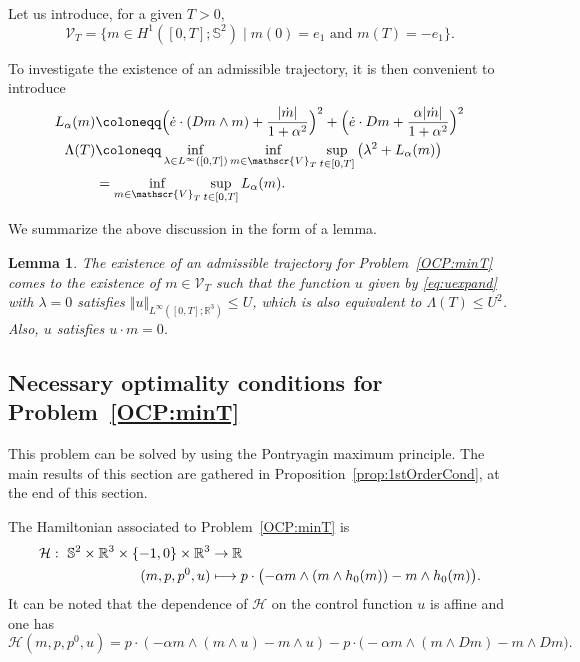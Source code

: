 \documentclass[10pt]{amsart}
\newcommand\mto{\mathchoice{\longmapsto}{\mapsto}{\mapsto}{\mapsto}}
\newtheorem{lemma}[theorem]{Lemma}
\theoremstyle{definition}
\newcommand{\R} {\mathbb{R}}
\begin{document}
Let us introduce, for a given $T>0$,
\[
\mathscr{V}_T=\{m\in H^1([0,T];\mathbb{S}^2)\mid m(0)=e_1\text{ and }m(T)=-e_1\}.
\]

To investigate the existence of an admissible trajectory, it is then convenient to introduce
\begin{align}\label{ob:aux}
L_\alpha(m) &\coloneqq \Bigl(\dot e\cdot (Dm\wedge m)+\frac{|\dot m|}{1+\alpha^2}\Bigr)^2+\Bigl(\dot e\cdot Dm+\frac{\alpha|\dot m|}{1+\alpha^2}\Bigr)^2\\
\Lambda(T)&\coloneqq \inf_{\lambda\in L^\infty([0,T])}\inf_{m\in \mathscr{V}_T}\sup_{t\in [0,T]}\left(\lambda^2+L_\alpha(m) \right)\nonumber \\
&= \inf_{m\in \mathscr{V}_T}\sup_{t\in [0,T]}L_\alpha(m).
\end{align}

We summarize the above discussion in the form of a lemma.

\begin{lemma}\label{lem:2057}
The existence of an admissible trajectory for Problem~\eqref{OCP:minT} comes to the existence of $m\in \mathscr{V}_T$ such that the function $u$ given by \eqref{eq:uexpand} with $\lambda =0$ satisfies $\Vert u\Vert_{L^\infty([0,T];\mathbb{R}^3)}\leq U $, which is also equivalent to $\Lambda(T)\leq U ^2$. Also, $u$ satisfies $u \cdot m=0$.
\end{lemma}

\subsection{Necessary optimality conditions for Problem~\texorpdfstring{\eqref{OCP:minT}}{P0}}\label{optCond:PMP}
This problem can be solved by using the Pontryagin maximum principle.
The main results of this section are gathered in Proposition~\ref{prop:1stOrderCond}, at the end of this section.

The Hamiltonian associated to Problem~\eqref{OCP:minT} is
\begin{align*}
\mathcal{H}:\
\mathbb{S}^2 \times \R^3\times \{-1,0\}\times \R^3 & \to \R\\
(m,p,p^0,u) &\mto p\cdot \bigl(- \alpha m \wedge (m \wedge h_0(m)) -m\wedge h_0(m)\bigr).
\end{align*}
It can be noted that the dependence of $\mathcal{H}$ on the control function $u$ is affine and one has
\[
\mathcal{H} (m,p,p^0,u)=p\cdot \left(- \alpha m \wedge (m \wedge u) - m \wedge u \right)-p\cdot \bigl(- \alpha m \wedge (m \wedge Dm)-m\wedge Dm\bigr).
\]
\end{document}
